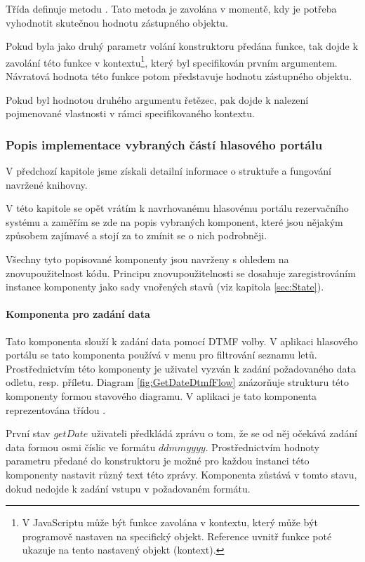 \documentclass[ing,male,java,dept460]{diploma}						%
\begin{document}
Třída definuje metodu . Tato metoda je zavolána v momentě, kdy je potřeba vyhodnotit skutečnou hodnotu zástupného objektu.

Pokud byla jako druhý parametr volání konstruktoru předána funkce, tak dojde k zavolání této funkce v kontextu\footnote{V JavaScriptu může být funkce zavolána v kontextu, který může být programově nastaven na specifický objekt. Reference  uvnitř funkce poté ukazuje na tento nastavený objekt (kontext).}, který byl specifikován prvním argumentem. Návratová hodnota této funkce potom představuje hodnotu zástupného objektu.

Pokud byl hodnotou druhého argumentu řetězec, pak dojde k nalezení pojmenované vlastnosti v rámci specifikovaného kontextu.

\subsubsection{Popis implementace vybraných částí hlasového portálu}
V předchozí kapitole jsme získali detailní informace o struktuře a fungování navržené knihovny.

V této kapitole se opět vrátím k navrhovanému hlasovému portálu rezervačního systému a zaměřím se zde na popis vybraných komponent, které jsou nějakým způsobem zajímavé a stojí za to zmínit se o nich podrobněji.

Všechny tyto popisované komponenty jsou navrženy s ohledem na znovupoužitelnost kódu. Principu znovupoužitelnosti se dosahuje zaregistrováním instance komponenty jako sady vnořených stavů (viz kapitola \ref{sec:State}).

\paragraph{Komponenta pro zadání data}
Tato komponenta slouží k zadání data pomocí DTMF volby. V aplikaci hlasového portálu se tato komponenta používá v menu pro filtrování seznamu letů. Prostřednictvím této komponenty je uživatel vyzván k zadání požadovaného data odletu, resp. příletu. Diagram \ref{fig:GetDateDtmfFlow} znázorňuje strukturu této komponenty formou stavového diagramu. V aplikaci je tato komponenta reprezentována třídou .

První stav $getDate$ uživateli předkládá zprávu o tom, že se od něj očekává zadání data formou osmi číslic ve formátu $ddmmyyyy$. Prostřednictvím hodnoty parametru předané do konstruktoru je možné pro každou instanci této komponenty nastavit různý text této zprávy. Komponenta zůstává v tomto stavu, dokud nedojde k zadání vstupu v požadovaném formátu.
\end{document}
